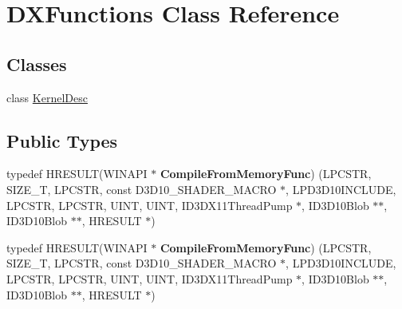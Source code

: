 \hypertarget{classDXFunctions}{}\section{D\+X\+Functions Class Reference}
\label{classDXFunctions}
\subsection*{Classes}
\begin{DoxyCompactItemize}
\item 
class \hyperlink{classDXFunctions_1_1KernelDesc}{Kernel\+Desc}
\end{DoxyCompactItemize}
\subsection*{Public Types}
\begin{DoxyCompactItemize}
\item 
\mbox{\label{classDXFunctions_ad24b223cc57a6b202b4a395912a88bed}} 
typedef H\+R\+E\+S\+U\+LT(W\+I\+N\+A\+PI $\ast$ {\bfseries Compile\+From\+Memory\+Func}) (L\+P\+C\+S\+TR, S\+I\+Z\+E\+\_\+T, L\+P\+C\+S\+TR, const D3\+D10\+\_\+\+S\+H\+A\+D\+E\+R\+\_\+\+M\+A\+C\+RO $\ast$, L\+P\+D3\+D10\+I\+N\+C\+L\+U\+DE, L\+P\+C\+S\+TR, L\+P\+C\+S\+TR, U\+I\+NT, U\+I\+NT, I\+D3\+D\+X11\+Thread\+Pump $\ast$, I\+D3\+D10\+Blob $\ast$$\ast$, I\+D3\+D10\+Blob $\ast$$\ast$, H\+R\+E\+S\+U\+LT $\ast$)
\item 
\mbox{\label{classDXFunctions_ad24b223cc57a6b202b4a395912a88bed}} 
typedef H\+R\+E\+S\+U\+LT(W\+I\+N\+A\+PI $\ast$ {\bfseries Compile\+From\+Memory\+Func}) (L\+P\+C\+S\+TR, S\+I\+Z\+E\+\_\+T, L\+P\+C\+S\+TR, const D3\+D10\+\_\+\+S\+H\+A\+D\+E\+R\+\_\+\+M\+A\+C\+RO $\ast$, L\+P\+D3\+D10\+I\+N\+C\+L\+U\+DE, L\+P\+C\+S\+TR, L\+P\+C\+S\+TR, U\+I\+NT, U\+I\+NT, I\+D3\+D\+X11\+Thread\+Pump $\ast$, I\+D3\+D10\+Blob $\ast$$\ast$, I\+D3\+D10\+Blob $\ast$$\ast$, H\+R\+E\+S\+U\+LT $\ast$)
\end{DoxyCompactItemize}
